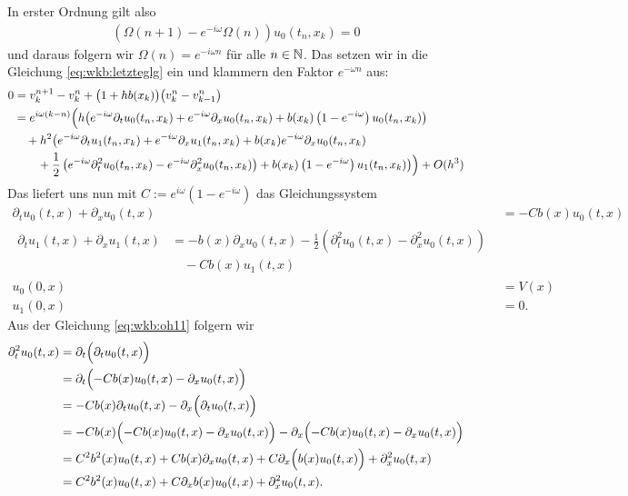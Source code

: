 In erster Ordnung gilt also
\begin{align}
\left( \Omega(n+1) - e^{-i \omega} \Omega(n)  \right) u_0(t_n, x_k) = 0
\end{align}
und daraus folgern wir $\Omega(n) = e^{- i \omega n}$ für alle $n \in \mathbb N$.
Das setzen wir in die Gleichung \eqref{eq:wkb:letzteglg} ein und klammern den
Faktor $e^{- \omega n}$ aus:
\begin{align}
\begin{split}
0 &= v^{n+1}_k - v^n_k + \bigl(1 + hb(x_k)\bigr) \bigl( v^n_k - v^n_{k-1} \bigr)\\
&= e^{i \omega (k - n)} \Bigl(
h \bigl( e^{-i \omega} \partial_t u_0(t_n, x_k) + e^{-i \omega} \partial_x u_0(t_n, x_k) + b(x_k) \left(1-e^{-i \omega}\right) u_0(t_n, x_k) \bigr)\\
&\quad + h^2 \bigl( e^{-i \omega} \partial_t u_1(t_n, x_k) + e^{-i \omega} \partial_x u_1(t_n, x_k) + b(x_k) e^{-i \omega} \partial_x u_0(t_n, x_k)\\
&\qquad + \frac{1}{2} \left( e^{-i \omega} \partial^2_t u_0(t_n, x_k) - e^{-i \omega} \partial^2_x u_0(t_n, x_k) \right)  + b(x_k) \left(1-e^{-i \omega}\right) u_1(t_n, x_k) \bigr) 
\Bigr) + O(h^3)
\end{split}
\end{align}
Das liefert uns nun mit $C := e^{i \omega} \left(1-e^{-i \omega}\right)$ das Gleichungssystem
\begin{align}\label{eq:wkb:oh11}
\partial_t u_0(t, x) + \partial_x u_0(t, x) &= - C b(x) u_0(t, x)\\
\begin{split}\label{eq:wkb:oh22}
\partial_t u_1(t, x) + \partial_x u_1(t, x) &= - b(x) \partial_x u_0(t, x) - \frac{1}{2} \left( \partial^2_t u_0(t, x) - \partial^2_x u_0(t, x) \right)\\
&\quad - C b(x) u_1(t, x)
\end{split}\\
u_0(0,x) &= V(x)\\
u_1(0,x) &= 0.
\end{align}
Aus der Gleichung \eqref{eq:wkb:oh11} folgern wir
\begin{align*}
\partial^2_t u_0(t,x) &= \partial_t \Bigl( \partial_t u_0(t,x) \Bigr)\\
&= \partial_t \Bigl( -C b(x) u_0(t,x) - \partial_x u_0(t,x) \Bigr)\\
&= - C b(x) \partial_t u_0(t,x) - \partial_x \Bigl( \partial_t u_0(t,x)  \Bigr)\\
&= - C b(x) \Bigl( -C b(x) u_0(t,x) - \partial_x u_0(t,x) \Bigr) - \partial_x \Bigl( -C b(x) u_0(t,x) - \partial_x u_0(t,x) \Bigr)\\
&= C^2 b^2(x) u_0(t,x) + C b(x) \partial_x u_0(t,x) + C \partial_x \Bigl( b(x) u_0(t,x) \Bigr) + \partial^2_x u_0(t,x)\\
&= C^2 b^2(x) u_0(t,x) + C \partial_x b(x) u_0(t,x) + \partial^2_x u_0(t,x).
\end{align*}
